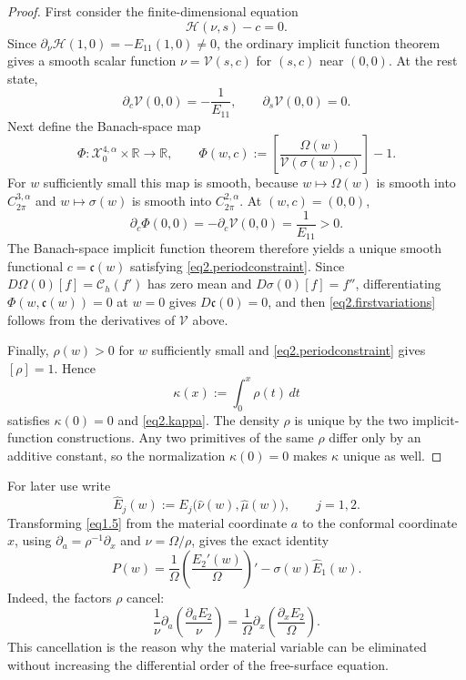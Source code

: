 \documentclass[12pt]{article}
\numberwithin{equation}{section}
\numberwithin{equation}{section}
\begin{document}
\begin{proof}
First consider the finite-dimensional equation
\[
\mathscr H(\nu,s)-c=0.
\]
Since $\partial_\nu\mathscr H(1,0)=-E_{11}(1,0)\neq0$, the ordinary implicit
function theorem gives a smooth scalar function $\nu=\mathcal V(s,c)$ for $(s,c)$
near $(0,0)$.  At the rest state,
\[
\partial_c\mathcal V(0,0)=-\frac1{E_{11}},
\qquad
\partial_s\mathcal V(0,0)=0.
\]
Next define the Banach-space map
\[
\Phi:\mathcal X^{4,\alpha}_0\times\mathbb R\longrightarrow\mathbb R,
\qquad
\Phi(w,c)
:=
\left[\frac{\Omega(w)}{\mathcal V(\sigma(w),c)}\right]-1.
\]
For $w$ sufficiently small this map is smooth, because
$w\mapsto\Omega(w)$ is smooth into $C^{3,\alpha}_{2\pi}$ and
$w\mapsto\sigma(w)$ is smooth into $C^{2,\alpha}_{2\pi}$.  At $(w,c)=(0,0)$,
\[
\partial_c\Phi(0,0)
=-\partial_c\mathcal V(0,0)
=\frac1{E_{11}}>0.
\]
The Banach-space implicit function theorem therefore yields a unique smooth functional
$c=\mathfrak c(w)$ satisfying \eqref{eq2.periodconstraint}.  Since
$D\Omega(0)[f]=\mathcal C_h(f')$ has zero mean and
$D\sigma(0)[f]=f''$, differentiating $\Phi(w,\mathfrak c(w))=0$ at $w=0$ gives
$D\mathfrak c(0)=0$, and then \eqref{eq2.firstvariations} follows from the derivatives
of $\mathcal V$ above.

Finally, $\rho(w)>0$ for $w$ sufficiently small and \eqref{eq2.periodconstraint} gives
$[\rho]=1$.  Hence
\[
\kappa(x):=\int_0^x\rho(t)\,dt
\]
satisfies $\kappa(0)=0$ and \eqref{eq2.kappa}.  The density $\rho$ is unique by the two
implicit-function constructions.  Any two primitives of the same $\rho$ differ only by an
additive constant, so the normalization $\kappa(0)=0$ makes $\kappa$ unique as well.
\end{proof}

For later use write
\begin{equation}\label{eq2.Ehat}
\widehat E_j(w)
:=E_j\bigl(\widehat\nu(w),\widehat\mu(w)\bigr),
\qquad j=1,2.
\end{equation}
Transforming \eqref{eq1.5} from the material coordinate $a$ to the conformal coordinate
$x$, using $\partial_a=\rho^{-1}\partial_x$ and
$\nu=\Omega/\rho$, gives the exact identity
\begin{equation}\label{eq2.15}
P(w)
=
\frac1{\Omega}
\left(\frac{\widehat E_2'(w)}{\Omega}\right)'
-\sigma(w)\widehat E_1(w).
\end{equation}
Indeed, the factors $\rho$ cancel:
\[
\frac1\nu\partial_a
\left(\frac{\partial_aE_2}{\nu}\right)
=
\frac1\Omega\partial_x
\left(\frac{\partial_xE_2}{\Omega}\right).
\]
This cancellation is the reason why the material variable can be eliminated without
increasing the differential order of the free-surface equation.
\end{document}
